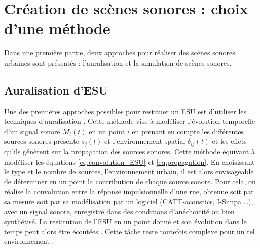 \section{Création de scènes sonores : choix d'une méthode}

Dans une première partie, deux approches pour réaliser des scènes sonores urbaines sont présentés : l'auralisation et la simulation de scènes sonores.

\subsection{Auralisation d'ESU}

Une des premières approches possibles pour restituer un ESU est d'utiliser les techniques d'auralisation \cite{forssen2009auralization}. Cette méthode vise à modéliser l'évolution temporelle d'un signal sonore $M_i(t)$ en un point $i$ en prenant en compte les différentes sources sonores présente $s_j(t)$ et l'environnement spatial $\delta_{ij}(t)$ et les effets qu'ils génèrent sur la propagation des sources sonores. Cette méthode équivaut à modéliser les équations \ref{eq:convolution_ESU} et \ref{eq:propagation}. En choisissant le type et le nombre de sources, l'environnement urbain, il est alors envisageable de déterminer en un point la contribution de chaque source sonore.
Pour cela, on réalise la convolution entre la réponse impulsionnelle d'une rue, obtenue soit par sa mesure soit par sa modélisation par un logiciel (CATT-acoustics, I-Simpa \dots), avec un signal sonore, enregistré dans des conditions d'anéchoïcité ou bien synthétisé. La restitution de l'ESU en un point donné et son évolution dans le temps peut alors être écoutées \cite{vorlander2007auralization}. Cette tâche reste toutefois complexe pour un tel environnement :

